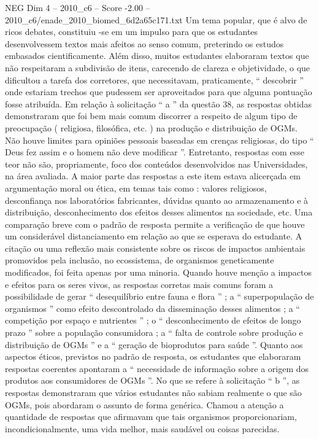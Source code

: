 \begin{textsample}{NEG Dim 4 – 2010\_c6 – Score -2.00 – 2010\_c6/enade\_2010\_biomed\_6d2a65c171.txt}
Um tema popular, que é alvo de ricos debates, constituiu -se em um impulso para que os estudantes desenvolvessem textos mais afeitos ao senso comum, preterindo os estudos embasados cientificamente.
Além disso, muitos estudantes elaboraram textos que não respeitaram a subdivisão de itens, carecendo de clareza e objetividade, o que dificultou a tarefa dos corretores, que necessitavam, praticamente, “ descobrir ” onde estariam trechos que pudessem ser aproveitados para que alguma pontuação fosse atribuída.
Em relação à solicitação “ a ” da questão 38, as respostas obtidas demonstraram que foi bem mais comum discorrer a respeito de algum tipo de preocupação ( religiosa, filosófica, etc. ) na produção e distribuição de OGMs.
Não houve limites para opiniões pessoais baseadas em crenças religiosas, do tipo “ Deus fez assim e o homem não deve modificar ”.
Entretanto, respostas com esse teor não são, propriamente, foco dos conteúdos desenvolvidos nas Universidades, na área avaliada.
A maior parte das respostas a este item estava alicerçada em argumentação moral ou ética, em temas tais como : valores religiosos, desconfiança nos laboratórios fabricantes, dúvidas quanto ao armazenamento e à distribuição, desconhecimento dos efeitos desses alimentos na sociedade, etc.
Uma comparação breve com o padrão de resposta permite a verificação de que houve um considerável distanciamento em relação ao que se esperava do estudante.
A citação ou uma reflexão mais consistente sobre os riscos de impactos ambientais promovidos pela inclusão, no ecossistema, de organismos geneticamente modificados, foi feita apenas por uma minoria.
Quando houve menção a impactos e efeitos para os seres vivos, as respostas corretas mais comuns foram a possibilidade de gerar “ desequilíbrio entre fauna e flora ” ; a “ superpopulação de organismos ” como efeito descontrolado da disseminação desses alimentos ; a “ competição por espaço e nutrientes ” ; o “ desconhecimento de efeitos de longo prazo ” sobre a população consumidora ; a “ falta de controle sobre produção e distribuição de OGMs ” e a “ geração de bioprodutos para saúde ”.
Quanto aos aspectos éticos, previstos no padrão de resposta, os estudantes que elaboraram respostas coerentes apontaram a “ necessidade de informação sobre a origem dos produtos aos consumidores de OGMs ”.
No que se refere à solicitação “ b ”, as respostas demonstraram que vários estudantes não sabiam realmente o que são OGMs, pois abordaram o assunto de forma genérica.
Chamou a atenção a quantidade de respostas que afirmavam que tais organismos proporcionariam, incondicionalmente, uma vida melhor, mais saudável ou coisas parecidas.

\end{textsample}
